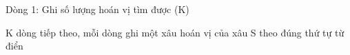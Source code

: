 Dòng 1: Ghi số lượng hoán vị tìm được (K)  

   K dòng tiếp theo, mỗi dòng ghi một xâu hoán vị của xâu S theo đúng thứ tự từ điển